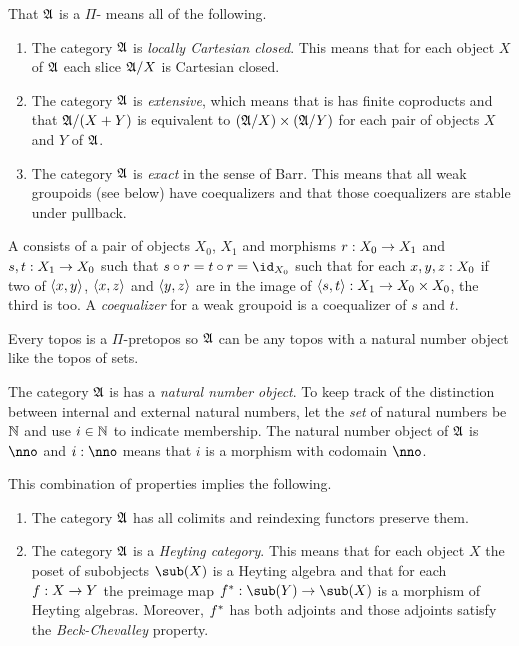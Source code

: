 \documentclass[csh.tex]{subfiles}
\begin{document}
\begin{definition} 
That $\mathfrak A$ is a $\Pi$- means all of the following.

\begin{enumerate}
\item The category $\mathfrak A$ is \emph{locally Cartesian closed}. This means that for each object $X$ of $\mathfrak A$ each slice $\mathfrak A/X$ is Cartesian closed.
\item The category $\mathfrak A$ is \emph{extensive}, which means that is has finite coproducts and that $\mathfrak A/(X+Y)$ is equivalent to $(\mathfrak A/X)\times(\mathfrak A/Y)$ for each pair of objects $X$ and $Y$ of $\mathfrak A$.
\item The category $\mathfrak A$ is \emph{exact} in the sense of Barr. This means that all weak groupoids (see below) have coequalizers and that those coequalizers are stable under pullback.
\end{enumerate}

A  consists of a pair of objects $X_0$, $X_1$ and morphisms $r: X_0\to X_1$ and $s,t: X_1\to X_0$ such that $s\circ r= t\circ r = \id_{X_0}$ such that for each $x,y,z: X_0$ if two of $\left\langle x,y \right\rangle$, $\left\langle x,z \right\rangle$ and $\left\langle y,z \right\rangle$ are in the image of $\left\langle s,t \right\rangle: X_1\to X_0\times X_0$, the third is too. A \emph{coequalizer} for a weak groupoid is a coequalizer of $s$ and $t$.
\end{definition}

\begin{example} Every topos is a $\Pi$-pretopos so $\mathfrak A$ can be any topos with a natural number object like the topos of sets. \end{example}

The category $\mathfrak A$ is has a \emph{natural number object}. To keep track of the distinction between internal and external natural numbers, let the \emph{set} of natural numbers be $\mathbb N$ and use $i\in \mathbb N$ to indicate membership. The natural number object of $\mathfrak A$ is $\nno$ and $i\of\nno$ means that $i$ is a morphism with codomain $\nno$.

This combination of properties implies the following.
\begin{enumerate}
\item The category $\mathfrak A$ has all colimits and reindexing functors preserve them. 
\item The category $\mathfrak A$ is a \emph{Heyting category}. This means that for each object $X$ the poset of subobjects $\sub(X)$ is a Heyting algebra and that for each $f: X\to Y$ the preimage map $f\ri\of\sub(Y)\to\sub(X)$ is a morphism of Heyting algebras. Moreover, $f^*$ has both adjoints and those adjoints satisfy the \emph{Beck-Chevalley} property.
\end{enumerate}
\end{document}

